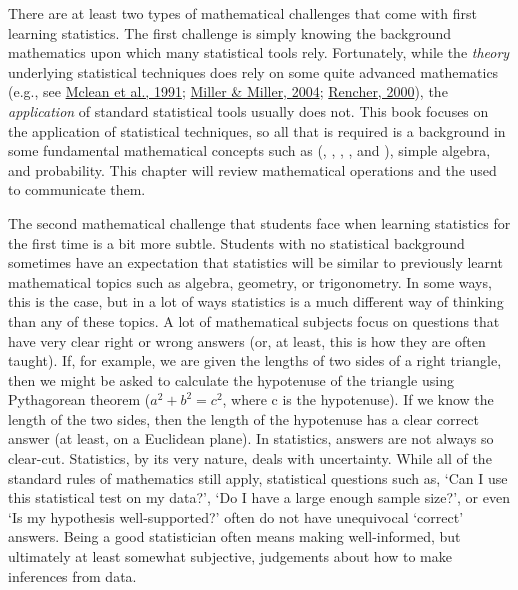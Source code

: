 \documentclass[
  openany]{krantz}
\begin{document}
There are at least two types of mathematical challenges that come with first learning statistics.
The first challenge is simply knowing the background mathematics upon which many statistical tools rely.
Fortunately, while the \emph{theory} underlying statistical techniques does rely on some quite advanced mathematics (e.g., see \protect\hyperlink{ref-Mclean1991}{Mclean et al., 1991}; \protect\hyperlink{ref-Miller2004}{Miller \& Miller, 2004}; \protect\hyperlink{ref-Rencher2000}{Rencher, 2000}), the \emph{application} of standard statistical tools usually does not.
This book focuses on the application of statistical techniques, so all that is required is a background in some fundamental mathematical concepts such as  (, , , , and ), simple algebra, and probability.
This chapter will review mathematical operations and the  used to communicate them.

The second mathematical challenge that students face when learning statistics for the first time is a bit more subtle.
Students with no statistical background sometimes have an expectation that statistics will be similar to previously learnt mathematical topics such as algebra, geometry, or trigonometry.
In some ways, this is the case, but in a lot of ways statistics is a much different way of thinking than any of these topics.
A lot of mathematical subjects focus on questions that have very clear right or wrong answers (or, at least, this is how they are often taught).
If, for example, we are given the lengths of two sides of a right triangle, then we might be asked to calculate the hypotenuse of the triangle using Pythagorean theorem (\(a^{2} + b^{2} = c^{2}\), where c is the hypotenuse).
If we know the length of the two sides, then the length of the hypotenuse has a clear correct answer (at least, on a Euclidean plane).
In statistics, answers are not always so clear-cut.
Statistics, by its very nature, deals with uncertainty.
While all of the standard rules of mathematics still apply, statistical questions such as, `Can I use this statistical test on my data?', `Do I have a large enough sample size?', or even `Is my hypothesis well-supported?' often do not have unequivocal `correct' answers.
Being a good statistician often means making well-informed, but ultimately at least somewhat subjective, judgements about how to make inferences from data.
\end{document}
